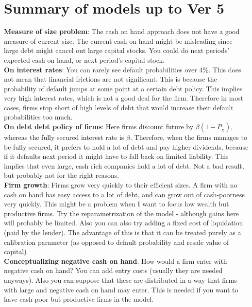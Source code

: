 \documentclass[12pt]{article}
\begin{document}
\section*{Summary of models up to Ver 5}

\textbf{Measure of size problem}: The cash on hand approach does not have a good measure of current size. The current cash on hand might be misleading since large debt might cancel out large capital stocks. You could do next periods' expected cash on hand, or next period's capital stock. \vspace{3mm} \\
\textbf{On interest rates}: You can rarely see default probabilities over 4\%. This does not mean that financial frictions are not significant. This is because the probability of default jumps at some point at a certain debt policy. This implies very high interest rates, which is not a good deal for the firm. Therefore in most cases, firms stop short of high levels of debt that would increase their default probabilities too much. \vspace{3mm} \\
\textbf{On debt debt policy of firms}: Here firms discount future by $\beta(1-P_\chi)$, whereas the fully secured interest rate is $\beta$. Therefore, when the firms manages to be fully secured, it prefers to hold a lot of debt and pay higher dividends, because if it defaults next period it might have to fall back on limited liability. This implies that even large, cash rich companies hold a lot of debt. Not a bad result, but probably not for the right reasons. \vspace{3mm} \\
\textbf{Firm growth}: Firms grow very quickly to their efficient sizes. A firm with no cash on hand has easy access to a lot of debt, and can grow out of cash-poorness very quickly. This might be a problem when I want to focus low wealth but productive firms. Try the reparametrization of the model - although gains here will probably be limited. Also you can also try adding a fixed cost of liquidation (paid by the lender). The advantage of this is that it can be treated purely as a calibration parameter (as opposed to default probability and resale value of capital) \vspace{3mm} \\
\textbf{Conceptualizing negative cash on hand}. How would a firm enter with negative cash on hand? You can add entry costs (usually they are needed anyways). Also you can suppose that these are distributed in a way that firms with large and negative cash on hand may enter. This is needed if you want to have cash poor but productive firms in the model. 
\setcounter{equation}{0}
\end{document}
